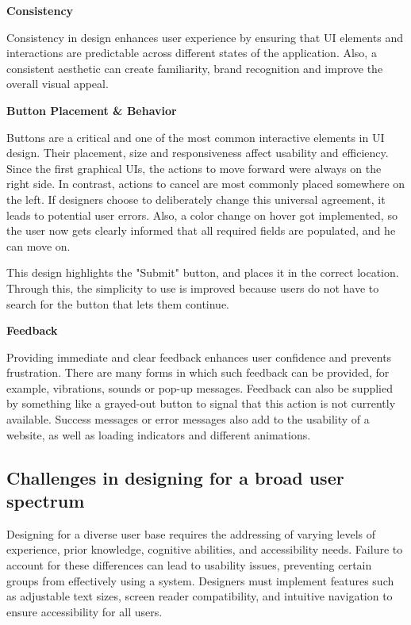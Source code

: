 \textbf{Consistency}

Consistency in design enhances user experience by ensuring that UI elements and interactions are predictable across different states of the application. Also, a consistent aesthetic can create familiarity, brand recognition and improve the overall visual appeal.

\blankLine

\textbf{Button Placement \& Behavior}

Buttons are a critical and one of the most common interactive elements in UI design. Their placement, size and responsiveness affect usability and efficiency. Since the first graphical UIs, the actions to move forward were always on the right side. In contrast, actions to cancel are most commonly placed somewhere on the left. If designers choose to deliberately change this universal agreement, it leads to potential user errors. Also, a color change on hover got implemented, so the user now gets clearly informed that all required fields are populated, and he can move on. 

\blankLine

    This design highlights the "Submit" button, and places it in the correct location. Through this, the simplicity to use is improved because users do not have to search for the button that lets them continue.

\blankLine

\textbf{Feedback}

Providing immediate and clear feedback enhances user confidence and prevents frustration. There are many forms in which such feedback can be provided, for example, vibrations, sounds or pop-up messages. Feedback can also be supplied by something like a grayed-out button to signal that this action is not currently available. Success messages or error messages also add to the usability of a website, as well as loading indicators and different animations.

\subsection{Challenges in designing for a broad user spectrum}

Designing for a diverse user base requires the addressing of varying levels of experience, prior knowledge, cognitive abilities, and accessibility needs. Failure to account for these differences can lead to usability issues, preventing certain groups from effectively using a system. Designers must implement features such as adjustable text sizes, screen reader compatibility, and intuitive navigation to ensure accessibility for all users.

